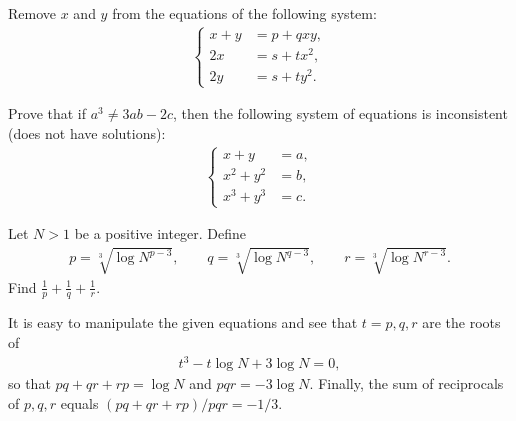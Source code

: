 \begin{question}
    Remove $x$ and $y$ from the equations of the following system:
    \begin{align*}
        \begin{cases}
            x + y &= p + qxy,\\ 2x &=s+tx^2,\\ 2y &=s+ty^2.
        \end{cases}
    \end{align*}
\end{question}


\begin{question}
    Prove that if $a^3 \neq 3ab-2c$, then the following system of equations is inconsistent (does not have solutions):
    \begin{align*}
        \begin{cases}
            x+y &= a,\\ x^2+y^2 &= b,\\ x^3+y^3 &= c.
        \end{cases}
    \end{align*}
\end{question}


\begin{question}
    Let $N>1$ be a positive integer. Define
    \begin{align*}
        p=\sqrt[3]{\log N^{p-3}}, \qquad q=\sqrt[3]{\log N^{q-3}}, \qquad r=\sqrt[3]{\log N^{r-3}}.
    \end{align*}
    Find $\displaystyle \frac{1}{p}+\frac{1}{q}+\frac{1}{r}$.
\end{question}

\begin{solution}
    It is easy to manipulate the given equations and see that $t=p,q,r$ are the roots of
    \begin{align*}
        t^3 - t\log N + 3\log N = 0,
    \end{align*}
    so that $pq+qr+rp=\log N$ and $pqr=-3\log N$. Finally, the sum of reciprocals of $p,q,r$ equals $(pq+qr+rp)/pqr=-1/3$.
\end{solution}


